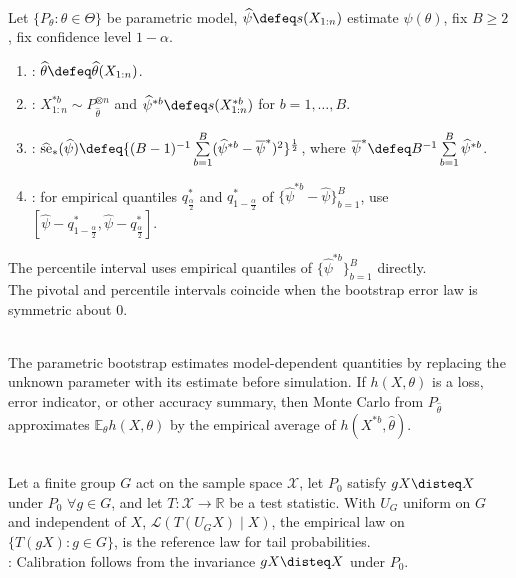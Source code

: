 \begin{method} \label{meth:parametric-bootstrap-standard-errors-and-intervals} \\
Let $\{P_\theta:\theta\in\Theta\}$ be parametric model, $\widehat{\psi}\defeq s(X_{1:n})$ estimate $\psi(\theta)$, fix $B\geq2$, fix confidence level $1-\alpha$.
\begin{enumerate}[label=(\roman*)]
\setlength{\itemsep}{0pt}
\item {}: $\widehat{\theta}\defeq\widehat{\theta}(X_{1:n})$.
\item {}: $X_{1:n}^{\ast b}\sim P_{\widehat{\theta}}^{\otimes n}$ and $\widehat{\psi}^{\ast b}\defeq s(X_{1:n}^{\ast b})$ for $b=1,\ldots,B$.
\item {}: $\widehat{\operatorname{se}}_\ast(\widehat{\psi})\defeq\{(B-1)^{-1}\sum\limits_{b=1}^{B}(\widehat{\psi}^{\ast b}-\overline{\psi}^{\ast})^2\}^{\frac{1}{2}}$, where $\overline{\psi}^{\ast}\defeq B^{-1}\sum\limits_{b=1}^{B}\widehat{\psi}^{\ast b}$.
\item {}: for empirical quantiles $q_{\frac{\alpha}{2}}^\ast$ and $q_{1-\frac{\alpha}{2}}^\ast$ of $\{\widehat{\psi}^{\ast b}-\widehat{\psi}\}_{b=1}^{B}$, use $[\widehat{\psi}-q_{1-\frac{\alpha}{2}}^\ast,\widehat{\psi}-q_{\frac{\alpha}{2}}^\ast]$.
\end{enumerate}
The percentile interval uses empirical quantiles of $\{\widehat{\psi}^{\ast b}\}_{b=1}^{B}$ directly.\\
The pivotal and percentile intervals coincide when the bootstrap error law is symmetric about $0$.
\end{method}

\begin{remark} \label{rem:parametric-bootstrap-plug-in-principle} \\
The parametric bootstrap estimates model-dependent quantities by replacing the unknown parameter with its estimate before simulation. If $h(X,\theta)$ is a loss, error indicator, or other accuracy summary, then Monte Carlo from $P_{\widehat{\theta}}$ approximates $\mathbb{E}_\theta h(X,\theta)$ by the empirical average of $h(X^{\ast b},\widehat{\theta})$.
\end{remark}

\begin{definition} \label{def:permutation-test} \\
Let a finite group $G$ act on the sample space $\mathcal{X}$, let $P_0$ satisfy $gX\disteq X$ under $P_0$ $\forall g\in G$, and let $T:\mathcal{X}\to\mathbb{R}$ be a test statistic. With $U_G$ uniform on $G$ and independent of $X$, $\mathcal{L}(T(U_GX)\mid X)$, the empirical law on $\{T(gX):g\in G\}$, is the reference law for tail probabilities.\\
: Calibration follows from the invariance $gX\disteq X$ under $P_0$.
\end{definition}

